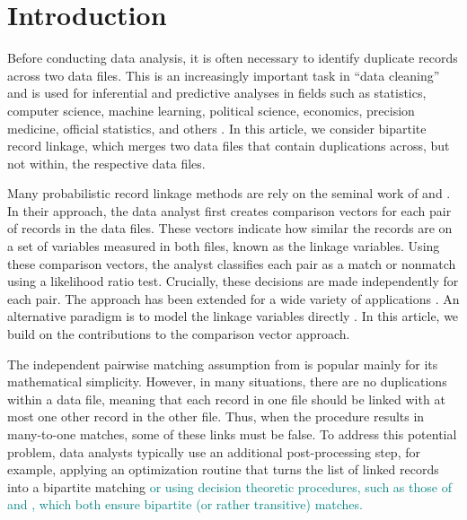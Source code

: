 \documentclass[ba]{imsart}
\begin{document}
\begin{frontmatter}
\begin{keyword}
\end{keyword}


\end{frontmatter}






\section{Introduction}
\label{sec:introduction}

Before conducting data analysis, it is often necessary to identify duplicate records across two data files. This is an increasingly important task in ``data cleaning'' and is used for inferential and predictive analyses in fields such as statistics, computer science, machine learning, political science, economics, precision medicine, official statistics, and others \citep{christen_2012, gutman2013bayesian, DalzellReiter18, tang2020}. In this article, we consider bipartite record linkage, which merges two data files that contain duplications across, but not within, the respective data files. 

Many probabilistic record linkage methods are rely on the seminal work of \cite{fellegi_theory_1969} and \cite{newcombe_automatic_1959}. In their approach, the data analyst first creates comparison vectors for each pair of records in the data files. These vectors indicate how similar the records are on a set of variables measured in both files, known as the linkage variables.  Using these comparison vectors, the analyst classifies each pair as a match or nonmatch using a likelihood ratio test. Crucially, these decisions are made independently for each pair. The \cite{fellegi_theory_1969} approach has been extended for a wide variety of applications \citep[e.g.,][]{Winkler1990, fair2004generalized, wagner2014person, gill2003english, enamorado2019using, aleshinguendel2021multifile}. An alternative paradigm is to model the linkage variables directly \citep[e.g.,][]{tancredi2011hierarchical, steorts_bayesian_2016, marchant_distributed_2019, betancourt2021prior}. In this article, we build on the contributions to the comparison vector approach. 



The independent pairwise matching assumption from \cite{fellegi_theory_1969} is popular mainly for its mathematical simplicity. However, in many situations, there are no duplications within a data file, meaning that each record in one file should be linked with at most one other record in the other file. Thus, when the procedure results in many-to-one matches, some of these links must be false. To address this potential problem, data analysts typically use an additional post-processing step, for example, applying an optimization routine that turns the list of linked records into a bipartite matching \citep{jaro1989} \textcolor{teal}{or using decision theoretic procedures, such as those of \cite{sadinle_bayesian_2017} and \cite{steorts_bayesian_2016}, which both ensure  bipartite (or rather transitive) matches.}
\end{document}
